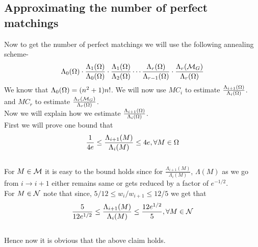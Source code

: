 \subsection{Approximating the number of perfect matchings}
\begin{flushleft}
	Now to get the number of perfect matchings we will use the following annealing scheme-
	$$\Lambda_0(\Omega)\cdot\frac{\Lambda_1(\Omega)}{\Lambda_0(\Omega)}\cdot\frac{\Lambda_1(\Omega)}{\Lambda_2(\Omega)}\cdots \frac{\Lambda_{r}(\Omega)}{\Lambda_{r-1}(\Omega)}\cdot
	\frac{\Lambda_r(\mathcal{M}_G)}{\Lambda_r(\Omega)}$$
	We know that $\Lambda_0(\Omega) = (n^2+1)n!$. We will now use $MC_i$ to estimate $\frac{\Lambda_{i+1}(\Omega)}{\Lambda_i(\Omega)}$.\\
	and $MC_r$ to estimate $\frac{\Lambda_r(\mathcal{M}_G)}{\Lambda_r(\Omega)}$.
	\\Now we will explain how we estimate $\frac{\Lambda_{i+1}(\Omega)}{\Lambda_i(\Omega)}$. \\
	First we will prove one bound that $$\frac{1}{4e}\leq\frac{\Lambda_{i+1}(M)}{\Lambda_i(M)}\leq 4e, \forall M \in \Omega$$ 
	\\For $M\in \mathcal{M}$ it is easy to the bound holds since for $\frac{\Lambda_{i+1}(M)}{\Lambda_i(M)}$, $\Lambda(M)$ as we go from $i\rightarrow i+1$ either remains same or gets reduced by a factor of $e^{-1/2}$.\\
	For $M\in \mathcal{N}$ note that since, $5/12 \leq w_i/w_{i+1} \leq 12/5$ we get that $$\frac{5}{12e^{1/2}}\leq\frac{\Lambda_{i+1}(M)}{\Lambda_i(M)}\leq \frac{12e^{1/2}}{5}, \forall M \in \mathcal{N}$$\\Hence now it is obvious that the above claim holds.
	
\end{flushleft}
